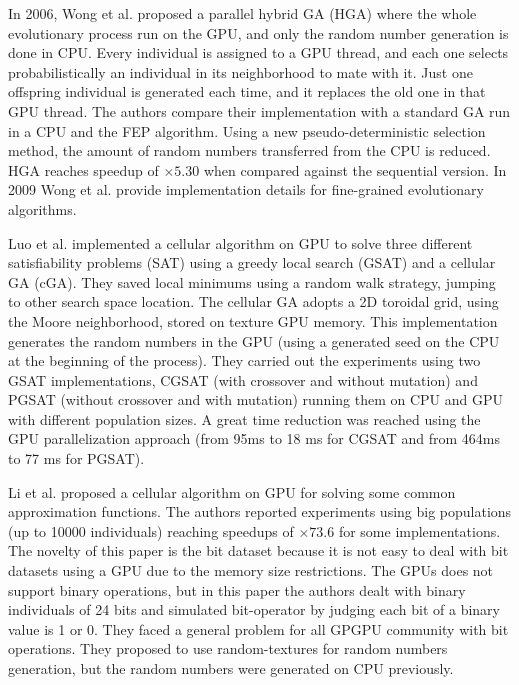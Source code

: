 \documentclass{comjnl}
\begin{document}
In 2006, Wong et al. \cite{man-leung-wong-parallel-2006} proposed a parallel hybrid GA (HGA) where the whole evolutionary process run on the GPU, and only the random number generation is done in CPU. Every individual is assigned to a GPU thread, and each one selects probabilistically an individual in its neighborhood to mate with it. Just one offspring individual is generated each time, and it replaces the old one in that GPU thread. The authors compare their implementation with a standard GA run in a CPU and the FEP \cite{man-leung-wong-parallel-2005} algorithm. Using a new pseudo-deterministic selection method, the amount of random numbers transferred from the CPU is reduced. HGA reaches speedup of $\times5.30$ when compared against the sequential version. In 2009 Wong et al. \cite{wong-implementation-2009} provide implementation details for fine-grained evolutionary algorithms.  

Luo et al. \cite{zhongwen-luo-cellular-2006} implemented a cellular algorithm on GPU to solve three different satisfiability problems (SAT) 
using a greedy local search (GSAT) \cite{Selman93domain-independentextensions} and a cellular GA (cGA). 
They saved local minimums using a random walk strategy, jumping to other search space location. 
The cellular GA adopts a 2D toroidal grid, using the Moore neighborhood, stored on texture GPU memory. This implementation generates the random numbers in the GPU (using a generated seed on the CPU at the beginning of the process). They carried out the experiments using two GSAT implementations, CGSAT (with crossover and without mutation) and PGSAT (without crossover and with mutation) running them on CPU and GPU with different population sizes. A great time reduction was reached using the GPU parallelization approach (from 95ms to 18 ms for CGSAT and from 464ms to 77 ms for PGSAT).

Li et al. \cite{jian_ming_li_efficient_2007} proposed a cellular algorithm on GPU for solving some common approximation functions. The authors reported experiments using big populations (up to 10000 individuals) reaching speedups of $\times73.6$ for some implementations. The novelty of this paper is the bit dataset because it is not easy to deal with bit datasets using a GPU due to the memory size restrictions. The GPUs does not support binary operations, but in this paper the authors dealt with binary individuals of 24 bits  and simulated bit-operator by judging each bit of a binary value is 1 or 0. They faced a general problem for all GPGPU community with bit operations. They proposed to use random-textures for random numbers generation, but the random numbers were generated on CPU previously. 
\end{document}
